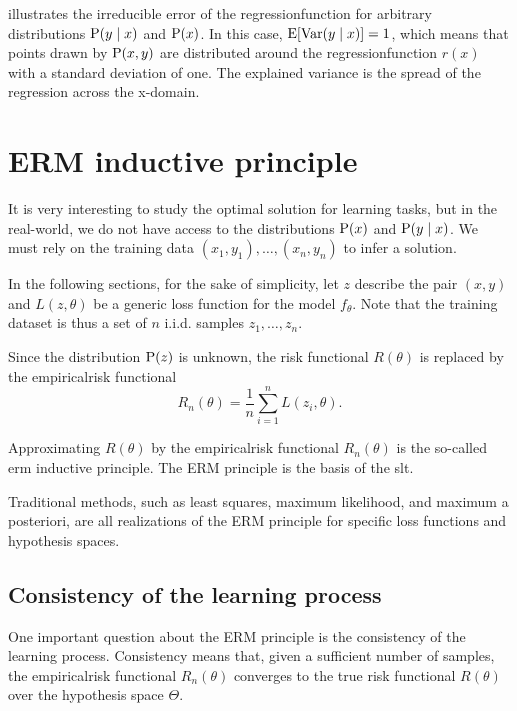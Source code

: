  illustrates the irreducible error of the
\gls{regressionfunction} for arbitrary distributions $\operatorname{P}(y \mid x)$ and $\operatorname{P}(x)$.
In this case, $\operatorname{E}\!\left[ \operatorname{Var}(y \mid x) \right] = 1$, which means that points drawn
by $\operatorname{P}(x, y)$ are distributed around the \gls{regressionfunction} $r(x)$ with a standard
deviation of one.  The explained variance is the spread of the regression across the
x-domain.

\section{ERM inductive principle}

It is very interesting to study the optimal solution for learning tasks, but in the
real-world, we do not have access to the distributions $\operatorname{P}(x)$ and $\operatorname{P}(y \mid x)$.
We must rely on the training data $(x_1, y_1), \dots, (x_n, y_n)$ to infer a solution.

In the following sections, for the sake of simplicity, let $z$ describe the pair $(x, y)$
and $L(z, \theta)$ be a generic \gls{loss} function for the model $f_\theta$.  Note that the
training dataset is thus a set of $n$ i.i.d. samples $z_1, \dots, z_n$.

Since the distribution $\operatorname{P}(z)$ is unknown, the risk functional $R(\theta)$ is replaced by
the \gls{empiricalrisk} functional
\begin{equation}
  \label{eq:empirical-risk}
  R_n(\theta) = \frac{1}{n} \sum_{i=1}^n L(z_i, \theta)\text{.}
\end{equation}

Approximating $R(\theta)$ by the \gls{empiricalrisk} functional $R_n(\theta)$ is the so-called
\gls{erm} inductive principle.  The ERM principle is the basis of the \gls{slt}.

Traditional methods, such as least squares, maximum likelihood, and maximum a posteriori, are
all realizations of the ERM principle for specific \gls{loss} functions and hypothesis spaces.

\subsection{Consistency of the learning process}

One important question about the ERM principle is the consistency of the learning process.
Consistency means that, given a sufficient number of samples, the \gls{empiricalrisk}
functional $R_n(\theta)$ converges to the true risk functional $R(\theta)$ over the
hypothesis space $\Theta$.

